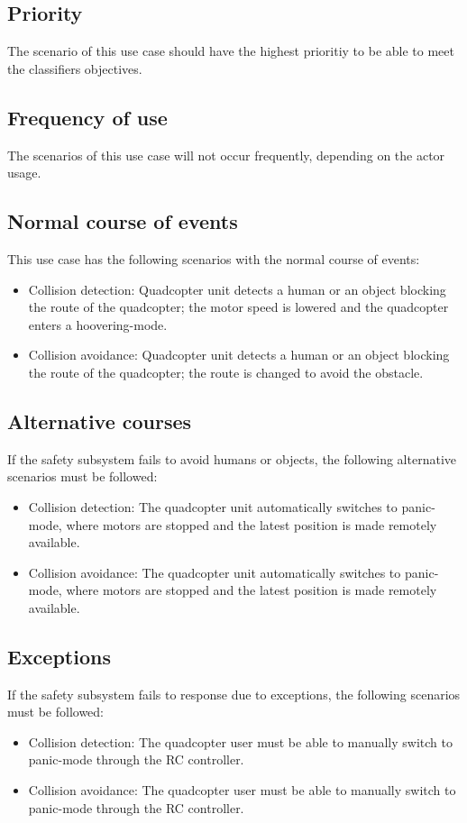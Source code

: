 \documentclass[a4paper]{article}
\begin{document}
\subsection{Priority}
The scenario of this use case should have the highest prioritiy to be able to meet the classifiers objectives.
\subsection{Frequency of use}
The scenarios of this use case will not occur frequently, depending on the actor usage.
\subsection{Normal course of events}
This use case has the following scenarios with the normal course of events:
\begin{itemize}
\item Collision detection: Quadcopter unit detects a human or an object blocking the route of the quadcopter; the motor speed is lowered and the quadcopter enters a hoovering-mode.
\item Collision avoidance: Quadcopter unit detects a human or an object blocking the route of the quadcopter; the route is changed to avoid the obstacle.
\end{itemize}
\subsection{Alternative courses}
If the safety subsystem fails to avoid humans or objects, the following alternative scenarios must be followed:
\begin{itemize}
\item Collision detection: The quadcopter unit automatically switches to panic-mode, where motors are stopped and the latest position is made remotely available. 
\item Collision avoidance: The quadcopter unit automatically switches to panic-mode, where motors are stopped and the latest position is made remotely available.
\end{itemize}

\subsection{Exceptions}
If the safety subsystem fails to response due to exceptions, the following scenarios must be followed:
\begin{itemize}
\item Collision detection: The quadcopter user must be able to manually switch to panic-mode through the RC controller.
\item Collision avoidance: The quadcopter user must be able to manually switch to panic-mode through the RC controller.
\end{itemize}
\end{document}
